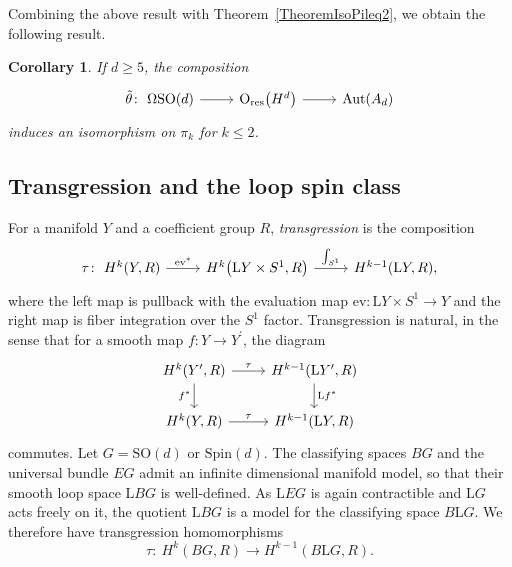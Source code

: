 \documentclass[10pt,a4paper]{amsart}
\numberwithin{equation}{section}
\newtheorem{Corollary}[Theorem]{Corollary}
\newcommand{\SO}{\mathrm{SO}}
\newcommand{\res}{\mathrm{res}}
\newcommand{\Aut}{\mathrm{Aut}}
\newcommand{\Spin}{\mathrm{Spin}}
\renewcommand{\O}{\mathrm{O}}
\renewcommand{\L}{\mathrm{L}}
\begin{document}
Combining the above result with Theorem~\ref{TheoremIsoPileq2}, we obtain the following result.

\begin{Corollary} \label{CorollaryDoubleIso}
 If $d \geq 5$, the composition
 \begin{equation*}%
 \begin{tikzcd}
 \tilde{\theta}\colon\ \Omega \SO(d) \ar[r] & \O_{\res}\big(H^d\big) \ar[r] & \Aut(A_d)
 \end{tikzcd}
 \end{equation*}
 induces an isomorphism on $\pi_k$ for $k \leq 2$.
\end{Corollary}



\subsection{Transgression and the loop spin class}
\label{SectionTransgression}

For a manifold $Y$ and a coefficient group $R$, \emph{transgression} is the composition
\begin{equation*}
\begin{tikzcd}
 \tau\colon\ H^k(Y, R) \ar[r, "\mathrm{ev}^*"] & H^k\big(\L Y \times S^1, R\big) \ar[r, "\int_{S^1}"] & H^{k-1}(\L Y, R),
\end{tikzcd}
\end{equation*}
where the left map is pullback with the evaluation map $\mathrm{ev}\colon \L Y \times S^1 \to Y$ and the right map is fiber integration over the $S^1$ factor.
Transgression is natural, in the sense that for a smooth map $f\colon Y \to Y^\prime$, the diagram
\begin{equation*}%
 \begin{tikzcd}
 H^k(Y^\prime, R) \ar[d, "f^*"'] \ar[r, "\tau"] & H^{k-1}(\L Y^\prime, R) \ar[d, "\L f^*"] \\
H^k(Y, R) \ar[r, "\tau"] & H^{k-1}(\L Y, R)
 \end{tikzcd}
\end{equation*}
commutes. Let $G = \SO(d)$ or $\Spin(d)$.
The classifying spaces $BG$ and the universal bundle $EG$ admit an infinite dimensional manifold model, so that their smooth loop space $\L BG$ is well-defined.
As $\L EG$ is again contractible and $\L G$ acts freely on it, the quotient $\L BG$ is a model for the classifying space $B \L G$.
We therefore have transgression homomorphisms
\begin{equation*}
 \tau\colon\ H^k(BG, R) \longrightarrow H^{k-1}(B\L G, R).
\end{equation*}
\end{document}
